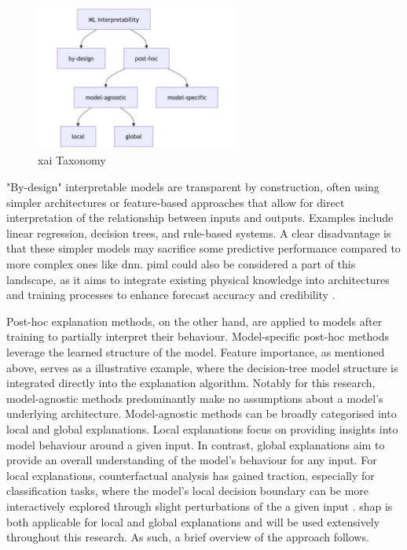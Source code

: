 \begin{figure}[ht]
    \centering
    \includegraphics[width=0.6\textwidth]{../figures/static/xai-taxonomy.jpg}
    \caption{\acrshort{xai} Taxonomy \citep{Molnar2025}}
    \label{fig:xai-taxonomy}
\end{figure}

"By-design" interpretable models are transparent by construction, often using simpler architectures or feature-based approaches that allow for direct interpretation of the relationship between inputs and outputs. Examples include linear regression, decision trees, and rule-based systems. A clear disadvantage is that these simpler models may sacrifice some predictive performance compared to more complex ones like \acrfull{dnn}. \acrfull{piml} could also be considered a part of this landscape, as it aims to integrate existing physical knowledge into architectures and training processes to enhance forecast accuracy and credibility \citep{Luo2025,Pathak2022}. 

Post-hoc explanation methods, on the other hand, are applied to models after training to partially interpret their behaviour. Model-specific post-hoc methods leverage the learned structure of the model. Feature importance, as mentioned above, serves as a illustrative example, where the decision-tree model structure is integrated directly into the explanation algorithm. Notably for this research, model-agnostic methods predominantly make no assumptions about a model's underlying architecture. Model-agnostic methods can be broadly categorised into local and global explanations. Local explanations focus on providing insights into model behaviour around a given input. In contrast, global explanations aim to provide an overall understanding of the model's behaviour for any input. For local explanations, counterfactual analysis has gained traction, especially for classification tasks, where the model's local decision boundary can be more interactively explored through slight perturbations of the a given input \citep{Mothilal2019}. \acrfull{shap} is both applicable for local and global explanations and will be used extensively throughout this research. As such, a brief overview of the approach follows.

